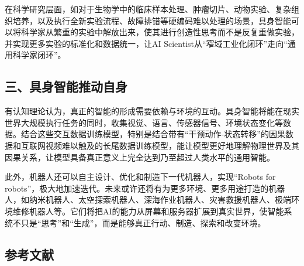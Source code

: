 在科学研究层面，如对于生物学中的临床样本处理、肿瘤切片、动物实验、复杂组织培养，以及执行全新实验流程、故障排错等硬编码难以处理的场景，具身智能可以将科学家从繁重的实验中解放出来，使其进行创造性思考而不是反复重做实验，并实现更多实验的标准化和数据统一，让AI Scientist从``窄域工业化闭环''走向``通用科学家闭环''。

\hypertarget{ux4e09ux5177ux8eabux667aux80fdux63a8ux52a8ux81eaux8eab}{%
\subsection{三、具身智能推动自身}\label{ux4e09ux5177ux8eabux667aux80fdux63a8ux52a8ux81eaux8eab}}

有认知理论认为，真正的智能的形成需要依赖与环境的互动。具身智能将能在现实世界大规模执行任务的同时，收集视觉、语言、传感器信号、环境状态变化等数据。结合这些交互数据训练模型，特别是结合带有``干预动作-状态转移''的因果数据和互联网视频难以触及的长尾数据训练模型，能让模型更好地理解物理世界及其因果关系，让模型具备真正意义上完全达到乃至超过人类水平的通用智能。

此外，机器人还可以自主设计、优化和制造下一代机器人，实现``Robots for robots''，极大地加速迭代。未来或许还将有为更多环境、更多用途打造的机器人，如纳米机器人、太空探索机器人、深海作业机器人、灾害救援机器人、极端环境维修机器人等。它们将把AI的能力从屏幕和服务器扩展到真实世界，使智能系统不只是``思考''和``生成''，而是能够真正行动、制造、探索和改变环境。

\hypertarget{ux53c2ux8003ux6587ux732e-175}{%
\subsection{参考文献}\label{ux53c2ux8003ux6587ux732e-175}}

